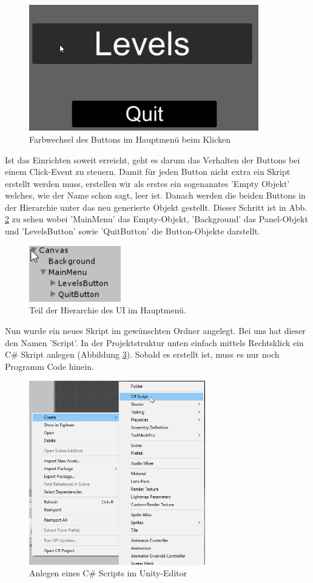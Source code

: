   \begin{figure}[H]
  	\centering
  	\includegraphics[width=10cm]{images/ButtonsClicked.png}
  	\caption{Farbwechsel des Buttons im Hauptmenü beim Klicken}
  	\label{ButtonClicked}
  \end{figure}


Ist das Einrichten soweit erreicht, geht es darum das Verhalten der Buttons bei einem Click-Event zu steuern. Damit für jeden Button nicht extra ein Skript erstellt werden muss, erstellen wir als erstes ein sogenanntes ’Empty Objekt’ welches, wie der Name schon sagt, leer ist. Danach werden die beiden Buttons in der Hierarchie unter das neu generierte Objekt gestellt. Dieser Schritt ist in Abb. \ref{MainMenuEmpty} zu sehen wobei ’MainMenu’ das Empty-Objekt, ’Background’ das Panel-Objekt und ’LevelsButton’ sowie ’QuitButton’ die Button-Objekte darstellt.

\begin{figure}[H]
	\includegraphics[width=4cm]{images/MainMenuEmpty.png}
	\caption{Teil der Hierarchie des UI im Hauptmenü.}
	\label{MainMenuEmpty}
\end{figure}
Nun wurde ein neues Skript im gewünschten Ordner angelegt. Bei uns hat dieser den Namen ’Script’. In der Projektstruktur unten einfach mittels Rechtsklick ein C\# Skript anlegen (Abbildung \ref{addScript}). Sobald es erstellt ist, muss es nur noch Programm Code hinein.

\begin{figure}[H]
	\includegraphics[height=8cm]{images/addScript.png}
	\caption{Anlegen eines C\# Scripts im Unity-Editor}
	\label{addScript}
\end{figure}


